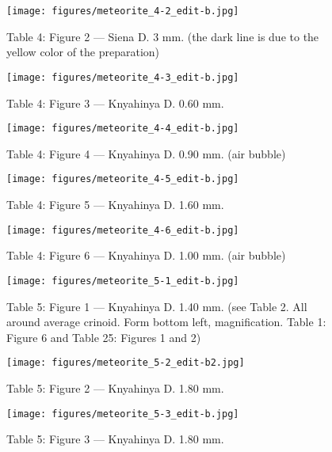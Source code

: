 \documentclass[a4paper, 12pt, oneside]{article}
\begin{document}
\clearpage
\begin{figure}[t]
\texttt{[image: figures/meteorite\_4-2\_edit-b.jpg]}
\caption{Table 4: Figure 2 --- Siena D. 3 mm. (the dark line is due to the yellow color of the preparation)}
\centering
\end{figure}
\clearpage
\begin{figure}[t]
\texttt{[image: figures/meteorite\_4-3\_edit-b.jpg]}
\caption{Table 4: Figure 3 --- Knyahinya D. 0.60 mm.}
\centering
\end{figure}
\clearpage
\begin{figure}[t]
\texttt{[image: figures/meteorite\_4-4\_edit-b.jpg]}
\caption{Table 4: Figure 4 --- Knyahinya D. 0.90 mm. (air bubble)}
\centering
\end{figure}
\clearpage
\begin{figure}[t]
\texttt{[image: figures/meteorite\_4-5\_edit-b.jpg]}
\caption{Table 4: Figure 5 --- Knyahinya D. 1.60 mm.}
\centering
\end{figure}
\clearpage
\begin{figure}[t]
\texttt{[image: figures/meteorite\_4-6\_edit-b.jpg]}
\caption{Table 4: Figure 6 --- Knyahinya D. 1.00 mm. (air bubble)}
\centering
\end{figure}
\clearpage
{}
\begin{figure}[t]
\texttt{[image: figures/meteorite\_5-1\_edit-b.jpg]}
\caption{Table 5: Figure 1 --- Knyahinya D. 1.40 mm. (see Table 2. All around average crinoid. Form bottom left, magnification. Table 1: Figure 6 and Table 25: Figures 1 and 2)}
\centering
\end{figure}
\clearpage
\begin{figure}[t]
\texttt{[image: figures/meteorite\_5-2\_edit-b2.jpg]}
\caption{Table 5: Figure 2 --- Knyahinya D. 1.80 mm.}
\centering
\end{figure}
\clearpage
\begin{figure}[t]
\texttt{[image: figures/meteorite\_5-3\_edit-b.jpg]}
\caption{Table 5: Figure 3 --- Knyahinya D. 1.80 mm.}
\centering
\end{figure}
\end{document}
